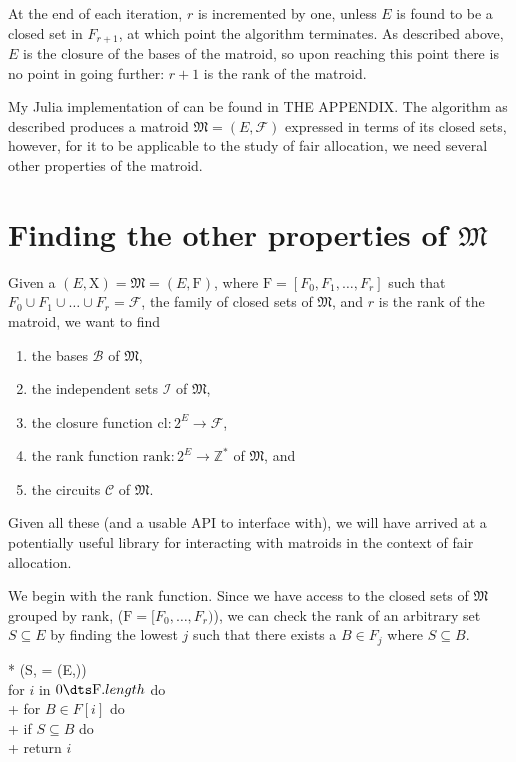 At the end of each iteration, $r$ is incremented by one, unless $E$ is found to be a closed set in $F_{r+1}$, at which point the algorithm terminates. As described above, $E$ is the closure of the bases of the matroid, so upon reaching this point there is no point in going further: $r+1$ is the rank of the matroid.

My Julia implementation of  can be found in THE APPENDIX. The algorithm as described produces a matroid $\mathfrak{M} = (E, \mathcal{F})$ expressed in terms of its closed sets, however, for it to be applicable to the study of fair allocation, we need several other properties of the matroid.



\section*{Finding the other properties of $\mathfrak{M}$}
Given a $(E, \mathrm{X}) = \mathfrak{M} = (E, \mathrm{F})$, where $\mathrm{F} = [F_0, F_1, \ldots, F_r]$ such that $F_0 \cup F_1 \cup \ldots \cup F_r = \mathcal{F}$, the family of closed sets of $\mathfrak{M}$, and $r$ is the rank of the matroid, we want to find
\begin{enumerate}
  \item the bases $\mathcal{B}$ of $\mathfrak{M}$,
  \item the independent sets $\mathcal{I}$ of $\mathfrak{M}$,
  \item the closure function $\text{cl} : 2^E \to \mathcal{F}$,
  \item the rank function $\text{rank} : 2^E \to \mathbb{Z}^*$ of $\mathfrak{M}$, and
  \item the circuits $\mathcal{C}$ of $\mathfrak{M}$.
\end{enumerate}

Given all these (and a usable API to interface with), we will have arrived at a potentially useful library for interacting with matroids in the context of fair allocation.

We begin with the rank function. Since we have access to the closed sets of $\mathfrak{M}$ grouped by rank, ($\mathrm{F} = [F_0, \ldots, F_r)$), we can check the rank of an arbitrary set $S \subseteq E$ by finding the lowest $j$ such that there exists a $B \in F_j$ where $S \subseteq B$.

\begin{pseudo}*
  ({S,  = (E,)})\\
  for $i$ in $0 \dts \mathrm{F}.length$ do \\+
  for $B \in F[i]$ do \\+
  if $S \subseteq B$ do \\+
  return $i$ 
\end{pseudo}

